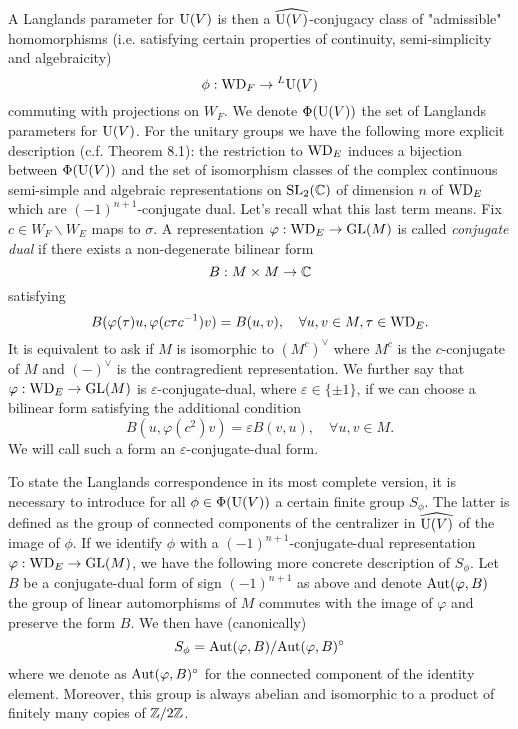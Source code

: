 A Langlands parameter for $\mathrm{U}(V)$ is then a $\widehat{\mathrm{U}(V)}$-conjugacy class of "admissible" homomorphisms (i.e. satisfying certain properties of continuity, semi-simplicity and algebraicity)
\[
    \phi: \mathrm{WD}_F \to {}^L \mathrm{U}(V)
\]
commuting with projections on $W_F$.
We denote $\Phi(\mathrm{U}(V))$ the set of Langlands parameters for $\mathrm{U}(V)$.
For the unitary groups we have the following more explicit description (c.f. \cite{gan2011symplectic} Theorem 8.1): the restriction to $\mathrm{WD}_E$ induces a bijection between $\Phi(\mathrm{U}(V))$ and the set of isomorphism classes of the complex continuous semi-simple and algebraic representations on $\mathrm{SL}_2(\mathbb{C})$ of dimension $n$ of $\mathrm{WD}_E$ which are $(-1)^{n+1}$-conjugate dual.
Let's recall what this last term means.
Fix $c \in W_F \backslash W_E$ maps to $\sigma$.
A representation $\varphi: \mathrm{WD}_E \to \mathrm{GL}(M)$ is called \emph{conjugate dual} if there exists a non-degenerate bilinear form
\[
    B: M \times M \to \mathbb{C}
\]
satisfying
\[
    B(\varphi(\tau)u, \varphi(c\tau c^{-1})v) = B(u, v), \quad \forall u, v \in M, \tau \in \mathrm{WD}_E.
\]
It is equivalent to ask if $M$ is isomorphic to $(M^c)^\vee$ where $M^c$ is the $c$-conjugate of $M$ and $(-)^\vee$ is the contragredient representation.
We further say that $\varphi: \mathrm{WD}_E \to \mathrm{GL}(M)$ is $\varepsilon$-conjugate-dual, where $\varepsilon \in \{\pm 1\}$, if we can choose a bilinear form satisfying the additional condition
\[
    B(u, \varphi(c^2)v) = \varepsilon B(v, u), \quad \forall u, v \in M.
\]
We will call such a form an $\varepsilon$-conjugate-dual form.

To state the Langlands correspondence in its most complete version, it is necessary to introduce for all $\phi \in \Phi(\mathrm{U}(V))$ a certain finite group $S_\phi$.
The latter is defined as the group of connected components of the centralizer in $\widehat{\mathrm{U}(V)}$ of the image of $\phi$.
If we identify $\phi$ with a $(-1)^{n+1}$-conjugate-dual representation $\varphi: \mathrm{WD}_E \to \mathrm{GL}(M)$, we have the following more concrete description of $S_\phi$.
Let $B$ be a conjugate-dual form of sign $(-1)^{n+1}$ as above and denote $\mathrm{Aut}(\varphi, B)$ the group of linear automorphisms of $M$ commutes with the image of $\varphi$ and preserve the form $B$.
We then have (canonically)
\[S_\phi = \mathrm{Aut}(\varphi, B) / \mathrm{Aut}(\varphi, B)^\circ\]
where we denote as $\mathrm{Aut}(\varphi, B)^\circ$ for the connected component of the identity element.
Moreover, this group is always abelian and isomorphic to a product of finitely many copies of $\mathbb{Z} / 2\mathbb{Z}$.